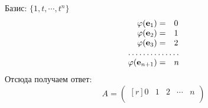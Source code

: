 Базис: $\{ 1, t,\cdots, t^n\}$\\
$$
\begin{array}{rl}
\varphi (\text{\textbf{e$_1$}})=&0\\
\varphi (\text{\textbf{e$_2$}})=&1\\
\varphi (\text{\textbf{e$_3$}})=&2\\
\hdotsfor{2}\\
\varphi (\text{\textbf{e$_{n+1}$}})=&n\\
\end{array}
$$
Отсюда получаем ответ:
$$A=
\begin{pmatrix*}[r]
 0 & 1 & 2 & \cdots & n\\
\end{pmatrix*}$$